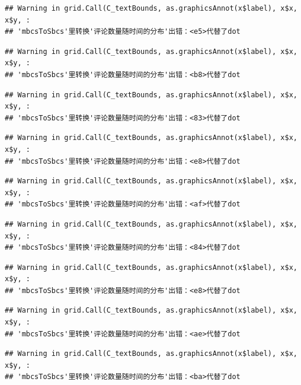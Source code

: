 \documentclass[
]{article}
\begin{document}
\begin{verbatim}
## Warning in grid.Call(C_textBounds, as.graphicsAnnot(x$label), x$x, x$y, :
## 'mbcsToSbcs'里转换'评论数量随时间的分布'出错：<e5>代替了dot
\end{verbatim}

\begin{verbatim}
## Warning in grid.Call(C_textBounds, as.graphicsAnnot(x$label), x$x, x$y, :
## 'mbcsToSbcs'里转换'评论数量随时间的分布'出错：<b8>代替了dot
\end{verbatim}

\begin{verbatim}
## Warning in grid.Call(C_textBounds, as.graphicsAnnot(x$label), x$x, x$y, :
## 'mbcsToSbcs'里转换'评论数量随时间的分布'出错：<83>代替了dot
\end{verbatim}

\begin{verbatim}
## Warning in grid.Call(C_textBounds, as.graphicsAnnot(x$label), x$x, x$y, :
## 'mbcsToSbcs'里转换'评论数量随时间的分布'出错：<e8>代替了dot
\end{verbatim}

\begin{verbatim}
## Warning in grid.Call(C_textBounds, as.graphicsAnnot(x$label), x$x, x$y, :
## 'mbcsToSbcs'里转换'评论数量随时间的分布'出错：<af>代替了dot
\end{verbatim}

\begin{verbatim}
## Warning in grid.Call(C_textBounds, as.graphicsAnnot(x$label), x$x, x$y, :
## 'mbcsToSbcs'里转换'评论数量随时间的分布'出错：<84>代替了dot
\end{verbatim}

\begin{verbatim}
## Warning in grid.Call(C_textBounds, as.graphicsAnnot(x$label), x$x, x$y, :
## 'mbcsToSbcs'里转换'评论数量随时间的分布'出错：<e8>代替了dot
\end{verbatim}

\begin{verbatim}
## Warning in grid.Call(C_textBounds, as.graphicsAnnot(x$label), x$x, x$y, :
## 'mbcsToSbcs'里转换'评论数量随时间的分布'出错：<ae>代替了dot
\end{verbatim}

\begin{verbatim}
## Warning in grid.Call(C_textBounds, as.graphicsAnnot(x$label), x$x, x$y, :
## 'mbcsToSbcs'里转换'评论数量随时间的分布'出错：<ba>代替了dot
\end{verbatim}
\end{document}
